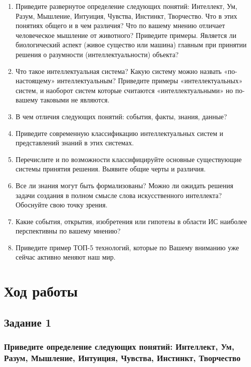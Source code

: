 \documentclass[14pt,a4paper,report]{report}
\begin{document}
\begin{enumerate}
	\item Приведите развернутое определение следующих понятий: Интеллект, Ум, Разум, Мышление, Интуиция, Чувства, Инстинкт, Творчество. Что в этих понятиях общего и в чем различия? Что по вашему мнению отличает человеческое мышление от животного? Приведите
	примеры. Является ли биологический аспект (живое существо или машина) главным при принятии
	решения о разумности (интеллектуальности) объекта?
	\item Что такое интеллектуальная система? Какую систему можно назвать «по-настоящему»
	интеллектуальным? Приведите примеры «интеллектуальных» систем, и наоборот систем
	которые считаются «интеллектуальными» но по-вашему таковыми не являются.
	\item В чем отличия следующих понятий: события, факты, знания, данные?
	\item Приведите современную классификацию интеллектуальных систем и представлений знаний
	в этих системах.
	\item Перечислите и по возможности классифицируйте основные существующие системы принятия
	решения. Выявите общие черты и различия.
	\item Все ли знания могут быть формализованы? Можно ли ожидать решения задачи создания в
	полном смысле слова искусственного интеллекта? Обоснуйте свою точку зрения.
	\item Какие события, открытия, изобретения или гипотезы в области ИС наиболее перспективны по
	вашему мнению?
	\item Приведите пример ТОП-5 технологий, которые по Вашему вниманию уже сейчас активно
	меняют наш мир.
\end{enumerate}

\clearpage

\section{Ход работы}

\subsection{Задание 1}

\subsubsection{Приведите определение следующих понятий: Интеллект, Ум, Разум, Мышление, Интуиция, Чувства, Инстинкт, Творчество}
\end{document}
